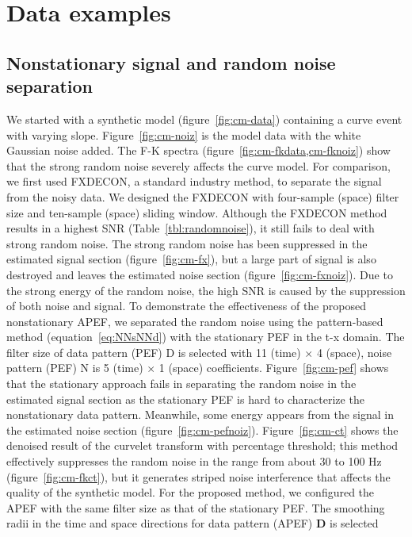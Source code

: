 \section{Data examples}

\subsection{Nonstationary signal and random noise separation}

We started with a synthetic model (figure~\ref{fig:cm-data}) containing a curve
event with varying slope. Figure~\ref{fig:cm-noiz} is the model data with the white
Gaussian noise added. The F-K spectra (figure~\ref{fig:cm-fkdata,cm-fknoiz}) show
that the strong random noise severely affects the curve model. For comparison,
we first used FXDECON, a standard industry method, to separate the
signal from the noisy data. We designed the FXDECON with four-sample
(space) filter size and ten-sample (space) sliding window. Although
the FXDECON method results in a highest SNR (Table~\ref{tbl:randomnoise}), it still fails
to deal with strong random noise. The strong random noise has been
suppressed in the estimated signal section (figure~\ref{fig:cm-fx}), but a large
part of signal is also destroyed and leaves the estimated noise
section (figure~\ref{fig:cm-fxnoiz}). Due to the strong energy of the random noise,
the high SNR is caused by the suppression of both noise and signal.
To demonstrate the effectiveness of the proposed nonstationary APEF,
we separated the random noise using the pattern-based method
(equation~\ref{eq:NNsNNd}) with the stationary PEF in the t-x domain.
The filter size of data pattern (PEF) D is selected with 11 (time)
$\times$ 4 (space), noise pattern (PEF) N is 5 (time) $\times$ 1
(space) coefficients. Figure~\ref{fig:cm-pef} shows that the stationary approach
fails in separating the random noise in the estimated signal section
as the stationary PEF is hard to characterize the nonstationary data
pattern. Meanwhile, some energy appears from the signal in the estimated
noise section (figure~\ref{fig:cm-pefnoiz}). Figure~\ref{fig:cm-ct} shows the
denoised result of the curvelet transform with percentage threshold;
this method effectively suppresses the random noise in the range from
about 30 to 100 Hz (figure~\ref{fig:cm-fkct}), but it generates
striped noise interference that affects the quality of the synthetic model.
For the proposed method, we configured the APEF with the same filter
size as that of the stationary PEF. The smoothing radii in the time
and space directions for data pattern (APEF) $\mathbf{D}$ is selected
